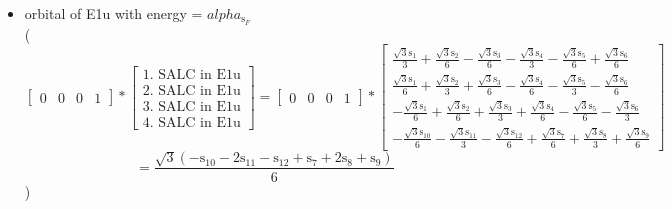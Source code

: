 \documentclass[12pt,a4paper]{article}
\begin{document}
\begin{itemize}
\textcolor{red}{Error in Orthogonalization of SALCs}\textcolor{red}{Error in Orthogonalization of SALCs}\textcolor{red}{Error in Orthogonalization of SALCs}\item orbital of E1u with energy = 
                                $alpha_{\text{s}_F}$ \\
( 
$$
\left[\begin{matrix}0 & 0 & 0 & 1\end{matrix}\right] * \left[\begin{array}{c}\text{1. SALC in E1u} \\ \text{2. SALC in E1u} \\ \text{3. SALC in E1u} \\ \text{4. SALC in E1u}\end{array}\right] = \left[\begin{matrix}0 & 0 & 0 & 1\end{matrix}\right] * \left[\begin{matrix}\frac{\sqrt{3} \text{s}_{1}}{3} + \frac{\sqrt{3} \text{s}_{2}}{6} - \frac{\sqrt{3} \text{s}_{3}}{6} - \frac{\sqrt{3} \text{s}_{4}}{3} - \frac{\sqrt{3} \text{s}_{5}}{6} + \frac{\sqrt{3} \text{s}_{6}}{6}\\\frac{\sqrt{3} \text{s}_{1}}{6} + \frac{\sqrt{3} \text{s}_{2}}{3} + \frac{\sqrt{3} \text{s}_{3}}{6} - \frac{\sqrt{3} \text{s}_{4}}{6} - \frac{\sqrt{3} \text{s}_{5}}{3} - \frac{\sqrt{3} \text{s}_{6}}{6}\\- \frac{\sqrt{3} \text{s}_{1}}{6} + \frac{\sqrt{3} \text{s}_{2}}{6} + \frac{\sqrt{3} \text{s}_{3}}{3} + \frac{\sqrt{3} \text{s}_{4}}{6} - \frac{\sqrt{3} \text{s}_{5}}{6} - \frac{\sqrt{3} \text{s}_{6}}{3}\\- \frac{\sqrt{3} \text{s}_{10}}{6} - \frac{\sqrt{3} \text{s}_{11}}{3} - \frac{\sqrt{3} \text{s}_{12}}{6} + \frac{\sqrt{3} \text{s}_{7}}{6} + \frac{\sqrt{3} \text{s}_{8}}{3} + \frac{\sqrt{3} \text{s}_{9}}{6}\end{matrix}\right] 
 $$ $$ = \frac{\sqrt{3} \left(- \text{s}_{10} - 2 \text{s}_{11} - \text{s}_{12} + \text{s}_{7} + 2 \text{s}_{8} + \text{s}_{9}\right)}{6} 
 $$ 
 )


\end{itemize}
\end{document}
